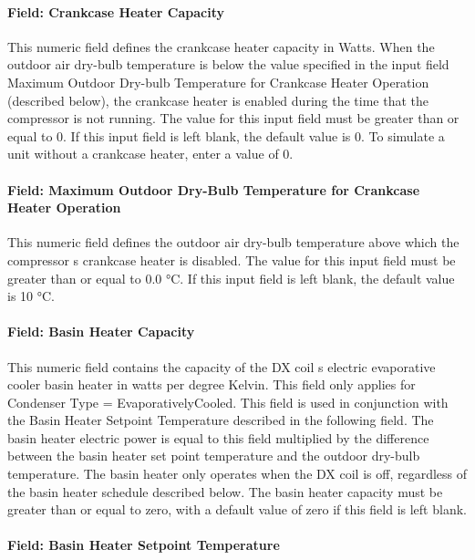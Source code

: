 \paragraph{Field: Crankcase Heater Capacity}\label{field-crankcase-heater-capacity-2}

This numeric field defines the crankcase heater capacity in Watts. When the outdoor air dry-bulb temperature is below the value specified in the input field Maximum Outdoor Dry-bulb Temperature for Crankcase Heater Operation (described below), the crankcase heater is enabled during the time that the compressor is not running. The value for this input field must be greater than or equal to 0. If this input field is left blank, the default value is 0. To simulate a unit without a crankcase heater, enter a value of 0.

\paragraph{Field: Maximum Outdoor Dry-Bulb Temperature for Crankcase Heater Operation}\label{field-maximum-outdoor-dry-bulb-temperature-for-crankcase-heater-operation-2}

This numeric field defines the outdoor air dry-bulb temperature above which the compressor s crankcase heater is disabled. The value for this input field must be greater than or equal to 0.0 °C. If this input field is left blank, the default value is 10 °C.

\paragraph{Field: Basin Heater Capacity}\label{field-basin-heater-capacity-3-000}

This numeric field contains the capacity of the DX coil s electric evaporative cooler basin heater in watts per degree Kelvin. This field only applies for Condenser Type = EvaporativelyCooled. This field is used in conjunction with the Basin Heater Setpoint Temperature described in the following field. The basin heater electric power is equal to this field multiplied by the difference between the basin heater set point temperature and the outdoor dry-bulb temperature. The basin heater only operates when the DX coil is off, regardless of the basin heater schedule described below. The basin heater capacity must be greater than or equal to zero, with a default value of zero if this field is left blank.

\paragraph{Field: Basin Heater Setpoint Temperature}\label{field-basin-heater-setpoint-temperature-3-000}

